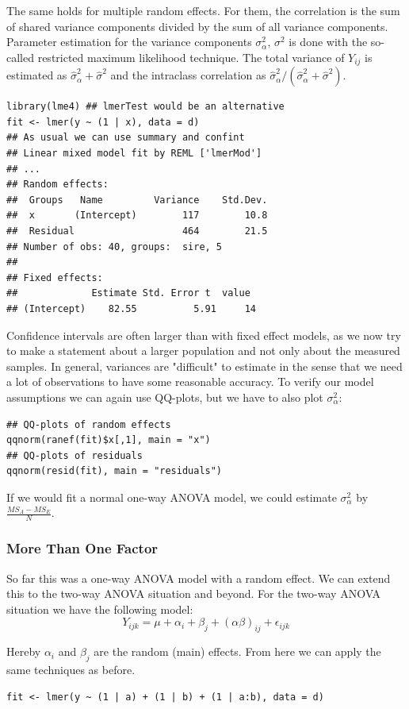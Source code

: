The same holds for multiple random effects. For them, the correlation is the sum of shared variance components divided by the sum of all variance components. Parameter estimation for the variance components $\sigma_\alpha^2,\, \sigma^2$ is done with the so-called restricted maximum likelihood technique. The total variance of $Y_{ij}$ is estimated as $\hat \sigma_\alpha^2 + \hat \sigma^2$ and the intraclass correlation as $ \hat \sigma_\alpha^2 / (\hat \sigma_\alpha^2 + \hat \sigma^2)$.

\begin{lstlisting}
library(lme4) ## lmerTest would be an alternative
fit <- lmer(y ~ (1 | x), data = d)
## As usual we can use summary and confint
## Linear mixed model fit by REML ['lmerMod']
## ...
## Random effects:
##  Groups   Name         Variance    Std.Dev.
##  x       (Intercept)        117        10.8    
##  Residual                   464        21.5    
## Number of obs: 40, groups:  sire, 5
## 
## Fixed effects:
##             Estimate Std. Error t  value
## (Intercept)    82.55          5.91     14
\end{lstlisting}

Confidence intervals are often larger than with fixed effect models, as we now try to make a statement about a larger population and not only about the measured samples. In general, variances are "difficult" to estimate in the sense that we need a lot of observations to have some reasonable accuracy. To verify our model assumptions we can again use QQ-plots, but we have to also plot $\sigma_\alpha^2$:
\begin{lstlisting}
## QQ-plots of random effects
qqnorm(ranef(fit)$x[,1], main = "x")
## QQ-plots of residuals
qqnorm(resid(fit), main = "residuals")
\end{lstlisting}

If we would fit a normal one-way ANOVA model, we could estimate $\sigma^2_\alpha$ by $\frac{MS_A - MS_E}{N}$.

\subsubsection{More Than One Factor}

So far this was a one-way ANOVA model with a random effect. We can extend this to the two-way ANOVA situation and beyond. For the two-way ANOVA situation we have the following model:
$$Y_{ijk} = \mu + \alpha_i + \beta_j + (\alpha \beta)_{ij} + \epsilon_{ijk}$$

Hereby $\alpha_i$ and $\beta_j$ are the random (main) effects. From here we can apply the same techniques as before.
\begin{lstlisting}
fit <- lmer(y ~ (1 | a) + (1 | b) + (1 | a:b), data = d)
\end{lstlisting}

